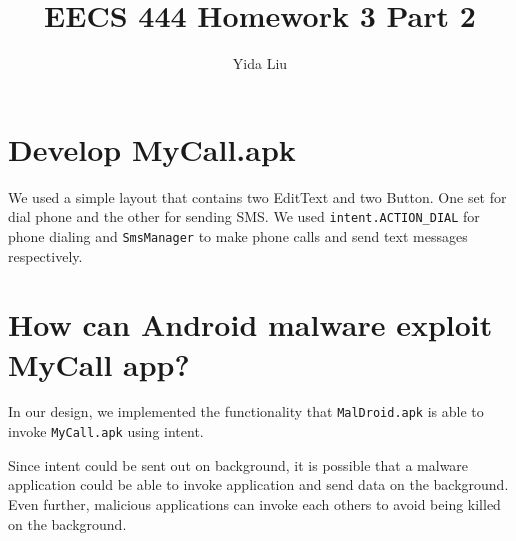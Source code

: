 \documentclass[11pt]{article}
\begin{document}
\author{Yida Liu}
\title{EECS 444 Homework 3 Part 2}
\maketitle


\section{Develop MyCall.apk}

We used a simple layout that contains two EditText and two Button. One set for dial phone and the other for sending SMS. We used \lstinline{intent.ACTION_DIAL} for phone dialing and \lstinline{SmsManager} to make phone calls and send text messages respectively.

\section{How can Android malware exploit MyCall app?}

In our design, we implemented the functionality that \lstinline{MalDroid.apk} is able to invoke \lstinline{MyCall.apk} using intent.

Since intent could be sent out on background, it is possible that a malware application could be able to invoke application and send data on the background. Even further, malicious applications can invoke each others to avoid being killed on the background.
\end{document}
